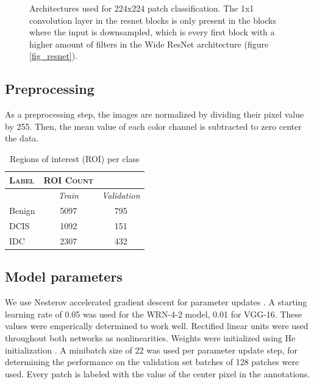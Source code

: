 \documentclass[journal]{IEEEtran}
\begin{document}
\begin{figure}[!t]
{\label{fig_vgg}}
\vspace{-0.12cm}
\caption{Architectures used for 224x224 patch classification. The 1x1 convolution layer in the resnet blocks is only present in the blocks where the input is downsampled, which is every first block with a higher amount of filters in the Wide ResNet architecture (figure \ref{fig_resnet}).}
\label{fig_architectures}
\end{figure}

\subsection{Preprocessing}
As a preprocessing step, the images are normalized by dividing their pixel value by 255. Then, the mean value of each color channel is subtracted to zero center the data.

\begin{table}[!t]
\renewcommand{\arraystretch}{1.1}
\caption{Regions of interest (ROI) per class}
\label{table_roi_count}
\centering
\begin{tabular}{|lcc|}
\hline
\textsc{Label}&\textsc{ROI Count}&\\
\hline
&\textit{Train}&\textit{Validation}\\
Benign&5097& 795\\
DCIS&1092&  151\\
IDC&2307& 432\\
\hline

\end{tabular}
\end{table}


\subsection{Model parameters}
We use Nesterov accelerated gradient descent for parameter updates \cite{nesterov}. A starting learning rate of 0.05 was used for the WRN-4-2 model, 0.01 for VGG-16. These values were emperically determined to work well. Rectified linear units were used throughout both networks as nonlinearities. Weights were initialized using He initialization \cite{he_init}. A minibatch size of 22 was used per parameter update step, for determining the performance on the validation set batches of 128 patches were used. Every patch is labeled with the value of the center pixel in the annotations. 
\end{document}

